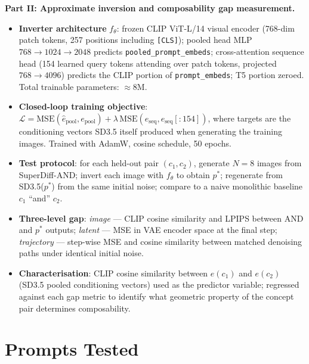 \documentclass[runningheads]{llncs}
\begin{document}
\textbf{Part II\@: Approximate inversion and composability gap measurement.}
\begin{itemize}
  \item \textbf{Inverter architecture} $f_\theta$: frozen CLIP ViT-L/14
    visual encoder (768-dim patch tokens, 257 positions including
    \texttt{[CLS]}); pooled head MLP
    $768 \!\to\! 1024 \!\to\! 2048$ predicts
    \texttt{pooled\_prompt\_embeds}; cross-attention sequence head
    (154 learned query tokens attending over patch tokens, projected
    $768 \!\to\! 4096$) predicts the CLIP portion of
    \texttt{prompt\_embeds}; T5 portion zeroed.
    Total trainable parameters: $\approx\!8\text{M}$.
  \item \textbf{Closed-loop training objective}:
    $\mathcal{L} = \mathrm{MSE}(\hat{e}_{\text{pool}}, e_{\text{pool}})
    + \lambda\,\mathrm{MSE}(\hat{e}_{\text{seq}}, e_{\text{seq}}[{:}154])$,
    where targets are the conditioning vectors SD3.5 itself produced
    when generating the training images.
    Trained with AdamW, cosine schedule, 50 epochs.
  \item \textbf{Test protocol}: for each held-out pair $(c_1, c_2)$,
    generate $N\!=\!8$ images from SuperDiff-AND; invert each image with
    $f_\theta$ to obtain $p^*$; regenerate from SD3.5($p^*$) from the
    same initial noise; compare to a naive monolithic baseline
    $c_1$ ``and'' $c_2$.
  \item \textbf{Three-level gap}:
    \emph{image} --- CLIP cosine similarity and LPIPS between AND and $p^*$
    outputs;
    \emph{latent} --- MSE in VAE encoder space at the final step;
    \emph{trajectory} --- step-wise MSE and cosine similarity between
    matched denoising paths under identical initial noise.
  \item \textbf{Characterisation}: CLIP cosine similarity between
    $e(c_1)$ and $e(c_2)$ (SD3.5 pooled conditioning vectors) used as
    the predictor variable; regressed against each gap metric to identify
    what geometric property of the concept pair determines composability.
\end{itemize}

\section{Prompts Tested}
\end{document}
